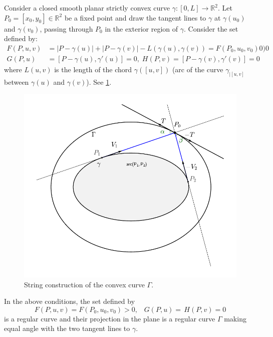 Consider a   closed smooth planar strictly convex curve $\gamma:[0,L]\to \mathbb {R}^2$. Let $P_0=[x_0,y_0]\in \mathbb{R}^2$ be a fixed point and draw the tangent lines to $\gamma$ at $\gamma(u_0)$ and $\gamma(v_0)$, passing through $P_0$ in the exterior region of $\gamma$.
Consider the set defined by:
\begin{align*}
F(P,u,v)&=|P-\gamma(u)|+|P-\gamma(v)|-L(\gamma(u),\gamma(v))=F(P_0,u_0,v_0)0)0\\
G(P,u)& =[P-\gamma(u),\gamma'(u)]=0,\; H(P,v)=[P-\gamma(v),\gamma'(v)]=0
\end{align*}
where $L(u,v)$ is the length of the chord $\gamma([u,v])$ (arc of the curve $\gamma_{|[u,v]}$ between $\gamma(u)$ and $\gamma(v)$).
See \cref{fig:appC-graves-convex}.
\begin{figure}
    \centering
    \includegraphics[scale=0.6]{zappC/pics/pics_appC_040_gravesgeral.pdf}
    \caption{String construction of the convex curve $\Gamma$. \label{fig:appC-graves-convex}}
   
\end{figure}

\begin{proposition} In the above conditions, the
 set defined by \[F(P,u,v)=F(P_0,u_0,v_0)>0, \;\;\; G(P,u)=\,H(P,v)=0\]
is a regular curve and their  projection in the plane is a regular curve $\Gamma$ making equal angle with the two  tangent lines to $\gamma$.
 \label{prop:appC-Gamma}
\end{proposition}

